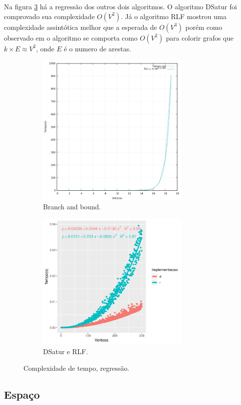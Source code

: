 \documentclass[12pt]{article}
\begin{document}
Na figura \ref{fig:regressaord} há a regressão dos outros dois algoritmos. O algoritmo DSatur foi comprovado sua complexidade \(O(V^2)\). Já o algoritmo RLF mostrou uma complexidade assintótica melhor que a esperada de \(O(V^3)\) porém como observado em \cite{Leighton_1979} o algoritmo se comporta como \(O(V^2)\) para colorir grafos que \(k\times E \approx V^2\), onde \(E\) é o numero de arestas.

\begin{center}
\begin{figure}
\begin{subfigure}[b]{.49\linewidth}
\centering
\includegraphics[width=7.5cm]{regressaobnb}
\caption{Branch and bound.}\label{fig:regressaobnb}
\end{subfigure}
\begin{subfigure}[b]{.49\linewidth}
\centering
\includegraphics[width=7.5cm]{regressaord}
\caption{DSatur e RLF.}\label{fig:regressaord}
\end{subfigure}
\caption{Complexidade de tempo, regressão.}
\end{figure}
\end{center}

\subsection{Espaço}
\label{sec:org6622c04}
\end{document}
